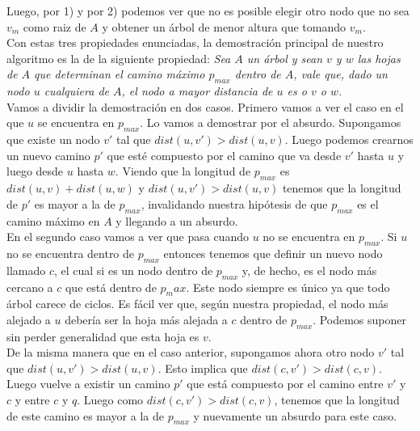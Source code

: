
Luego, por 1) y por 2) podemos ver que no es posible elegir otro nodo que no sea $v_m$ como raiz de $A$ y obtener un árbol de menor altura que tomando $v_m$.\\

\newpage
Con estas tres propiedades enunciadas, la demostración principal de nuestro algoritmo es la de la siguiente propiedad: \emph{Sea $A$ un árbol y sean $v$ y $w$ las hojas de $A$ que determinan el camino máximo $p_{max}$ dentro de $A$, vale que, dado un nodo $u$ cualquiera de $A$, el nodo a mayor distancia de $u$ es o $v$ o $w$.}\\

Vamos a dividir la demostración en dos casos. Primero vamos a ver el caso en el que $u$ se encuentra en $p_{max}$. Lo vamos a demostrar por el absurdo. Supongamos que existe un nodo $v'$ tal que $dist(u,v') > dist(u,v)$. Luego podemos crearnos un nuevo camino $p'$ que esté compuesto por el camino que va desde $v'$ hasta $u$ y luego desde $u$ hasta $w$. Viendo que la longitud de $p_{max}$ es $dist(u,v) + dist(u,w)$ y $dist(u,v') > dist(u,v)$ tenemos que la longitud de $p'$ es mayor a la de $p_{max}$, invalidando nuestra hipótesis de que $p_{max}$ es el camino máximo en $A$ y llegando a un absurdo.\\

En el segundo caso vamos a ver que pasa cuando $u$ no se encuentra en $p_{max}$. Si $u$ no se encuentra dentro de $p_{max}$ entonces tenemos que definir un nuevo nodo llamado $c$, el cual si es un nodo dentro de $p_{max}$ y, de hecho, es el nodo más cercano a $c$ que está dentro de $p_max$. Este nodo siempre es único ya que todo árbol carece de ciclos. Es fácil ver que, según nuestra propiedad, el nodo más alejado a $u$ debería ser la hoja más alejada a $c$ dentro de $p_{max}$. Podemos suponer sin perder generalidad que esta hoja es $v$.\\

De la misma manera que en el caso anterior, supongamos ahora otro nodo $v'$ tal que $dist(u,v') > dist(u,v)$. Esto implica que $dist(c,v') > dist(c,v)$. Luego vuelve a existir un camino $p'$ que está compuesto por el camino entre $v'$ y $c$ y entre $c$ y $q$. Luego como $dist(c,v') > dist(c,v)$, tenemos que la longitud de este camino es mayor a la de $p_{max}$ y nuevamente un absurdo para este caso. \Box

